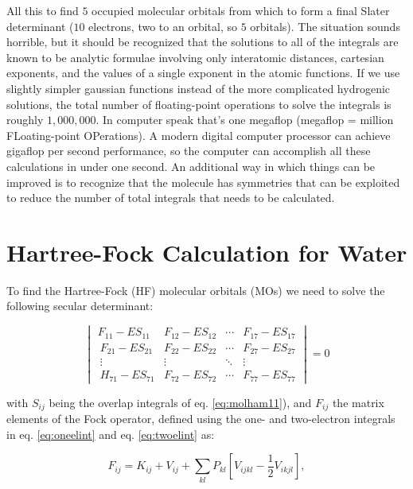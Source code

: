 \documentclass[
  9pt,
]{extbook}
\theoremstyle{definition}
\theoremstyle{definition}
\theoremstyle{definition}
\theoremstyle{remark}
\begin{document}
All this to find \(5\) occupied molecular orbitals from which to form a final Slater determinant (\(10\) electrons, two to an orbital, so \(5\) orbitals). The situation sounds horrible, but it should be recognized that the solutions to all of the integrals are known to be analytic formulae involving only interatomic distances, cartesian exponents, and the values of a single exponent in the atomic functions. If we use slightly simpler gaussian functions instead of the more complicated hydrogenic solutions, the total number of floating-point operations to solve the integrals is roughly \(1{,}000{,}000\). In computer speak that's one megaflop (megaflop = million FLoating-point OPerations). A modern digital computer processor can achieve gigaflop per second performance, so the computer can accomplish all these calculations in under one second. An additional way in which things can be improved is to recognize that the molecule has symmetries that can be exploited to reduce the number of total integrals that needs to be calculated.

\hypertarget{hartree-fock-calculation-for-water}{%
\section{Hartree-Fock Calculation for Water}\label{hartree-fock-calculation-for-water}}

To find the Hartree-Fock (HF) molecular orbitals (MOs) we need to solve the following secular determinant:

\begin{equation}
\begin{vmatrix}
F_{11}-ES_{11}   & F_{12}-ES_{12}   & \cdots & F_{17}-ES_{17}\\\
F_{21}-ES_{21}   & F_{22}-ES_{22}   & \cdots & F_{27}-ES_{27}\\\
\vdots           &   \vdots         & \ddots & \vdots\\\
H_{71}-ES_{71}   & F_{72}-ES_{72}   & \cdots & F_{77}-ES_{77}
\end{vmatrix}=0
\label{eq:hfequationh2o}
\end{equation}

with \(S_{ij}\) being the overlap integrals of eq. \eqref{eq:molham11}), and \(F_{ij}\) the matrix elements of the Fock operator, defined using the one- and two-electron integrals in eq. \eqref{eq:oneelint} and eq. \eqref{eq:twoelint} as:

\begin{equation}
F_{ij} = K_{ij} + V_{ij} + \sum_{kl} P_{kl} \left[ V_{ijkl} -\frac{1}{2}V_{ikjl} \right],
\label{eq:HFmatrixelement}
\end{equation}
\end{document}
